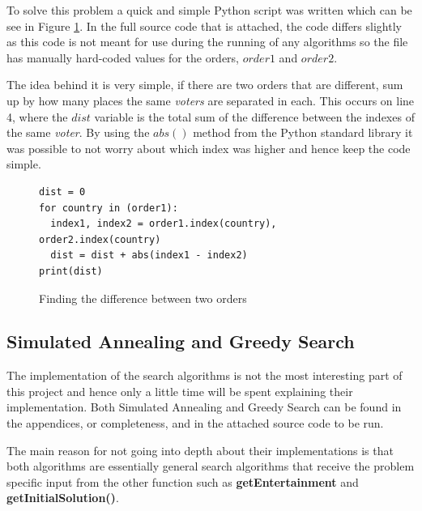 \documentclass[12pt]{report}
\begin{document}
To solve this problem a quick and simple Python script was written which can be see in Figure \ref{orderDiff}. In the full source code that is attached, the code differs slightly as this code is not meant for use during the running of any algorithms so the file has manually hard-coded values for the orders, $order1$ and $order2$.

The idea behind it is very simple, if there are two orders that are different, sum up by how many places the same \textit{voters} are separated in each. This occurs on line 4, where the $dist$ variable is the total sum of the difference between the indexes of the same \textit{voter}. By using the $abs()$ method from the Python standard library it was possible to not worry about which index was higher and hence keep the code simple.

\begin{figure}[H]
\caption{Finding the difference between two orders}
\label{orderDiff}
\begin{lstlisting}
dist = 0
for country in (order1):
  index1, index2 = order1.index(country), order2.index(country)
  dist = dist + abs(index1 - index2)
print(dist)
\end{lstlisting}
\end{figure}

\subsection{Simulated Annealing and Greedy Search}\label{Imp-searchAlgos}
The implementation of the search algorithms is not the most interesting part of this project and hence only a little time will be spent explaining their implementation. Both Simulated Annealing and Greedy Search can be found in the appendices, or completeness, and in the attached source code to be run.

The main reason for not going into depth about their implementations is that both algorithms are essentially general search algorithms that receive the problem specific input from the other function such as \textbf{getEntertainment} and \textbf{getInitialSolution()}.
\end{document}
